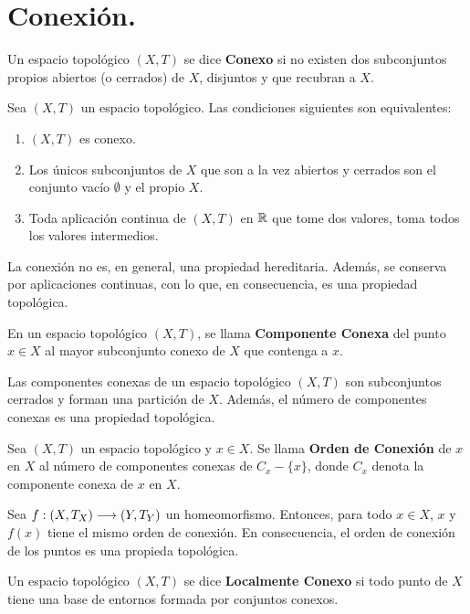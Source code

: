 \documentclass[cursovd_portada.tex]{subfiles}
\begin{document}
\newpage

\section{Conexión.}
\begin{defi}
Un espacio topológico $(X,T)$ se dice {\bf Conexo} si no existen dos subconjuntos propios abiertos (o cerrados) de
$X$, disjuntos y que recubran a $X$.
\end{defi}
\begin{teorema}
Sea $(X,T)$ un espacio topológico. Las condiciones siguientes son equivalentes:
\begin{enumerate}
\item $(X,T)$ es conexo.
\item Los únicos subconjuntos de $X$ que son a la vez abiertos y cerrados son el conjunto vacío $\emptyset$ y el
propio $X$.
\item Toda aplicación continua de $(X,T)$ en $\mathbb{R}$ que tome dos valores, toma todos los valores intermedios.
\end{enumerate}
\end{teorema}
\begin{prop}
La conexión no es, en general, una propiedad hereditaria. Además, se conserva por aplicaciones continuas, con lo
que, en consecuencia, es una propiedad topológica.
\end{prop}
\begin{defi}
En un espacio topológico $(X,T)$, se llama {\bf Componente Conexa} del punto $x\in X$ al mayor subconjunto conexo
de $X$ que contenga a $x$.
\end{defi}
\begin{prop}
Las componentes conexas de un espacio topológico $(X,T)$ son subconjuntos cerrados y forman una partición de $X$.
Además, el número de componentes conexas es una propiedad topológica.
\end{prop}
\begin{defi}
Sea $(X,T)$ un espacio topológico y $x\in X$. Se llama {\bf Orden de Conexión} de $x$ en $X$ al número de
componentes conexas de $C_x-\{x\}$, donde $C_x$ denota la componente conexa de $x$ en $X$.
\end{defi}
\begin{prop}
Sea $f:(X,T_X)\longrightarrow (Y,T_Y)$ un homeomorfismo. Entonces, para todo $x\in X$, $x$ y $f(x)$ tiene  el mismo orden de
conexión. En consecuencia, el orden de conexión de los puntos es una propieda topológica.
\end{prop}
\begin{defi}
Un espacio topológico $(X,T)$ se dice {\bf Localmente Conexo} si todo punto de $X$ tiene una base de entornos
formada por conjuntos conexos.
\end{defi}
\end{document}
